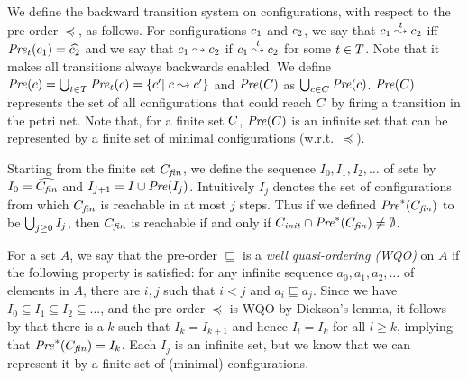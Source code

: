 We define the backward transition system on configurations, with
respect to the pre-order $\preceq$, as follows. For configurations
$c_1$ and $c_2$, we say that
$c_1\stackrel{t}{\leadsto}c_2$ iff
${\it Pre}_t(c_1)=\widehat{c_2}$ and we say that
$c_1\stackrel{}{\leadsto}c_2$ if
$c_1\stackrel{t}{\leadsto}c_2$ for some
$t\in T$. Note that it makes all transitions
always backwards enabled.
%
We define ${\it Pre}(c) =
\bigcup_{t\in T}{\it Pre}_t(c)=\left\{c'|\;c\stackrel{}{\leadsto}c'\right\}$
and ${\it Pre}(C)$ as
$\bigcup_{c\in C}{\it Pre}(c)$. ${\it Pre}(C)$ represents the
set of all configurations that could reach $C$ by firing a
transition in the petri net. Note that, for a finite set $C$,
${\it Pre}(C)$ is an infinite set that can be represented by a finite
set of minimal configurations (w.r.t.\ $\preceq$).

  Starting from the finite set $C_{\it fin}$,
we define the sequence $I_0,I_1,I_2,\ldots$ of sets by $I_0=\widehat{C_{\it fin}}$
and $I_{j+1}=I\cup{\it Pre}(I_j)$. Intuitively $I_j$ denotes the set of
configurations from which $C_{\it fin}$ is reachable in at most $j$
steps. Thus if we defined ${\it Pre}^*(C_{\it fin})$ to be
$\bigcup_{j\geq0}I_j$, then $C_{\it fin}$ is reachable if and only if
$C_{\it init}\cap{\it Pre}^*(C_{\it fin})\neq\emptyset$.

For a set $A$, we say that the pre-order $\sqsubseteq$ is a \emph{well
  quasi-ordering (WQO)} on $A$ if the following property is satisfied:
for any infinite sequence $a_0,a_1,a_2,\ldots$ of elements in $A$,
there are $i,j$ such that $i<j$ and $a_i\sqsubseteq a_j$.
%
Since we have $I_0\subseteq I_1\subseteq I_2\subseteq \ldots$, and the
pre-order $\preceq$ is WQO by Dickson's lemma, it follows by
\cite{Parosh:Bengt:Karlis:Tsay:general:IC} that there is a $k$ such
that $I_k=I_{k+1}$ and hence $I_l=I_{k}$ for all $l\geq k$, implying
that ${\it Pre}^*(C_{\it fin})=I_k$. Each $I_j$ is an infinite set, but we
know that we can represent it by a finite set of (minimal)
configurations.

